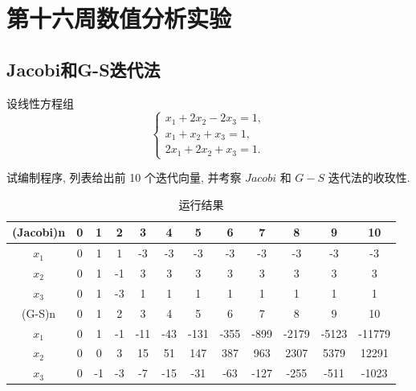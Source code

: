 \section{第十六周数值分析实验}
\subsection{Jacobi和G-S迭代法}
\begin{ex}
设线性方程组
$$
\left\{\begin{array}{l}
	x_1+2 x_2-2 x_3=1, \\
	x_1+x_2+x_3=1, \\
	2 x_1+2 x_2+x_3=1 .
\end{array}\right.
$$

试编制程序, 列表给出前 10 个迭代向量, 并考察 $J a c o b i$ 和 $G-S$ 迭代法的收玫性.
\end{ex}

\qa 
\begin{table}[H]
	\centering
	\caption{运行结果}
	\begin{tabular}{|c|ccccccccccc|}
		\hline
		(Jacobi)n & 0     & 1     & 2     & 3     & 4     & 5     & 6     & 7     & 8     & 9     & 10 \\
		\hline
		$x_1$    & 0     & 1     & 1     & -3    & -3    & -3    & -3    & -3    & -3    & -3    & -3 \\
		$x_2$   & 0     & 1     & -1    & 3     & 3     & 3     & 3     & 3     & 3     & 3     & 3 \\
		$x_3$    & 0     & 1     & -3    & 1     & 1     & 1     & 1     & 1     & 1     & 1     & 1 \\
		\hline\hline
		(G-S)n & 0     & 1     & 2     & 3     & 4     & 5     & 6     & 7     & 8     & 9     & 10 \\
		\hline
		$x_1$    & 0     & 1     & -1    & -11   & -43   & -131  & -355  & -899  & -2179 & -5123 & -11779 \\
		$x_2$    & 0     & 0     & 3     & 15    & 51    & 147   & 387   & 963   & 2307  & 5379  & 12291 \\
		$x_3$    & 0     & -1    & -3    & -7    & -15   & -31   & -63   & -127  & -255  & -511  & -1023 \\
		\hline
	\end{tabular}%
	\label{tab:addlabel-w16-1}%
\end{table}%


